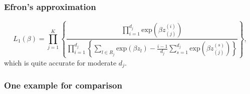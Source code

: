 \documentclass[a4paper,12pt]{article}
\begin{document}
\subsubsection{Efron's approximation}
\label{sec:efrons-approximation}

\begin{equation}
  \label{eq:efron_l1}
  L_1\left(\beta\right) =
  \prod\limits_{j = 1}^K\left\{
    \frac{
      \prod\limits_{i = 1}^{d_j}\mathrm{exp}\left(\beta z_{\left(j\right)}^{\left(i\right)}\right)
    }{
      \prod\limits_{i = 1}^{d_j}\left\{
        \sum_{l\in R_j}\mathrm{exp}\left(\beta z_l\right)
        - \frac{i - 1}{d_j}
        \sum\limits_{s = 1}^{d_j}\mathrm{exp}\left(\beta z_{\left(j\right)}^{\left(s\right)}\right)
      \right\}
    }
  \right\}
  ,
\end{equation}
which is quite accurate for moderate $d_j$.

\subsubsection{One example for comparison}
\label{sec:one-example-comp}
\end{document}
